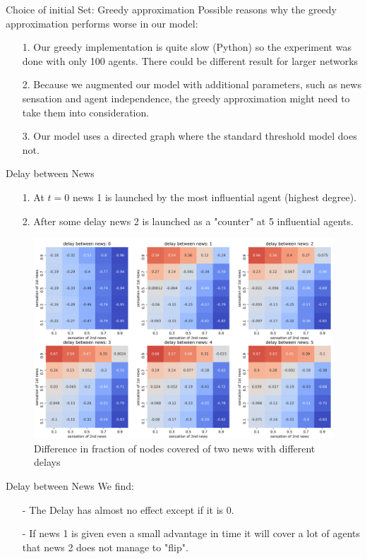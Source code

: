 \documentclass{beamer}
\begin{document}
\begin{frame}{Choice of initial Set: Greedy approximation}
    Possible reasons why the greedy approximation performs worse in our model:
    \begin{enumerate}
        \item [1.] Our greedy implementation is quite slow (Python) so the experiment was done with only 100 agents. There could be different result for larger networks
        \item[2.] Because we augmented our model with additional parameters, such as news sensation and agent independence, the greedy approximation might need to take them into consideration.
        \item[3.] Our model uses a directed graph where the standard threshold model does not.
    \end{enumerate}
\end{frame}

\begin{frame}{Delay between News}
\begin{enumerate}
    \item [1.] At $t=0$ news 1 is launched by the most influential agent (highest degree).
    \item [2.] After some delay news 2 is launched as a "counter" at 5 influential agents.
\end{enumerate}
    \begin{figure}
    \centering
    \includegraphics[width=.65\linewidth]{images/two_news_delays_no_decay_cut.png}
    \caption{Difference in fraction of nodes covered of two news with different delays}
    \end{figure}
\end{frame}

\begin{frame}{Delay between News}
    We find:
    \begin{enumerate}
        \item [-] The Delay has almost no effect except if it is 0.
        \item [-] If news 1 is given even a small advantage in time it will cover a lot of agents that news 2 does not manage to "flip".
    \end{enumerate}
\end{frame}
\end{document}
